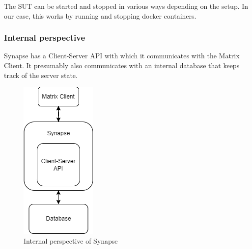 \documentclass{article}
\begin{document}
\noindent The SUT can be started and stopped in various ways depending on the setup. In our case, this works by running and stopping docker containers.

    

\subsubsection*{Internal perspective}
Synapse has a Client-Server API with which it communicates with the Matrix Client. It presumably also communicates with an internal database that keeps track of the server state.

\begin{figure}[h]
    \centering
    \includegraphics[width=0.18\linewidth]{internal_perspective.png}
    \caption{Internal perspective of Synapse}
    \label{fig:ext-per}
\end{figure}
\end{document}
